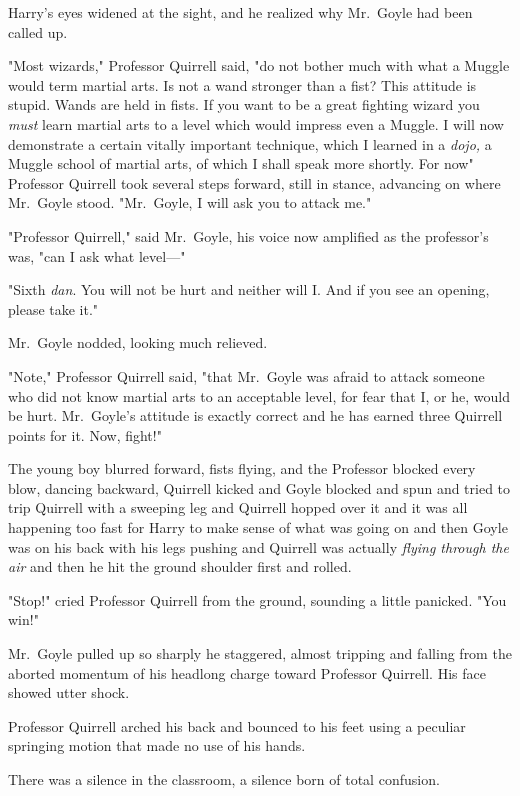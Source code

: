 Harry's eyes widened at the sight, and he realized why Mr.~Goyle had been
called up.

"Most wizards," Professor Quirrell said, "do not bother much with what a Muggle
would term martial arts. Is not a wand stronger than a fist? This attitude is
stupid. Wands are held in fists. If you want to be a great fighting wizard you
\emph{must} learn martial arts to a level which would impress even a Muggle. I
will now demonstrate a certain vitally important technique, which I learned in
a \emph{dojo,} a Muggle school of martial arts, of which I shall speak more
shortly. For now{\el}" Professor Quirrell took several steps forward, still
in stance, advancing on where Mr.~Goyle stood. "Mr.~Goyle, I will ask you to
attack me."

"Professor Quirrell," said Mr.~Goyle, his voice now amplified as the
professor's was, "can I ask what level---"

"Sixth \emph{dan}. You will not be hurt and neither will I. And if you see an
opening, please take it."

Mr.~Goyle nodded, looking much relieved.

"Note," Professor Quirrell said, "that Mr.~Goyle was afraid to attack someone
who did not know martial arts to an acceptable level, for fear that I, or he,
would be hurt. Mr.~Goyle's attitude is exactly correct and he has earned three
Quirrell points for it. Now, fight!"

The young boy blurred forward, fists flying, and the Professor blocked every
blow, dancing backward, Quirrell kicked and Goyle blocked and spun and tried to
trip Quirrell with a sweeping leg and Quirrell hopped over it and it was all
happening too fast for Harry to make sense of what was going on and then Goyle
was on his back with his legs pushing and Quirrell was actually \emph{flying
through the air} and then he hit the ground shoulder first and rolled.

"Stop!" cried Professor Quirrell from the ground, sounding a little panicked.
"You win!"

Mr.~Goyle pulled up so sharply he staggered, almost tripping and falling from
the aborted momentum of his headlong charge toward Professor Quirrell. His face
showed utter shock.

Professor Quirrell arched his back and bounced to his feet using a peculiar
springing motion that made no use of his hands.

There was a silence in the classroom, a silence born of total confusion.

